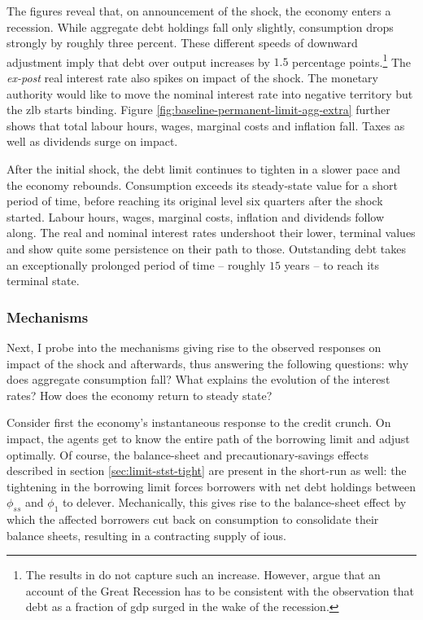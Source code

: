 \documentclass[a4paper,12pt]{article} %
\numberwithin{equation}{section} %
\numberwithin{figure}{section}
\numberwithin{table}{section}
\begin{document}
The figures reveal that, on announcement of the shock, the economy enters a recession. While aggregate debt holdings fall only slightly, consumption drops strongly by roughly three percent. These different speeds of downward adjustment imply that debt over output increases by $1.5$ percentage points.\footnote{The results in \textcite{gl2017} do not capture such an increase. However, \textcite{justiniano2015} argue that an account of the Great Recession has to be consistent with the observation that debt as a fraction of \Gls{gdp} surged in the wake of the recession.} The \textit{ex-post} real interest rate also spikes on impact of the shock. The monetary authority would like to move the nominal interest rate into negative territory but the \Gls{zlb} starts binding. Figure \ref{fig:baseline-permanent-limit-agg-extra} further shows that total labour hours, wages, marginal costs and inflation fall. Taxes as well as dividends surge on impact.

After the initial shock, the debt limit continues to tighten in a slower pace and the economy rebounds. Consumption exceeds its steady-state value for a short period of time, before reaching its original level six quarters after the shock started. Labour hours, wages, marginal costs, inflation and dividends follow along. The real and nominal interest rates undershoot their lower, terminal values and show quite some persistence on their path to those. Outstanding debt takes an exceptionally prolonged period of time -- roughly $15$ years -- to reach its terminal state. 

\subsubsection{Mechanisms}
\label{sec:limit-transition-mechanisms}

Next, I probe into the mechanisms giving rise to the observed responses on impact of the shock and afterwards, thus answering the following questions: why does aggregate consumption fall? What explains the evolution of the interest rates? How does the economy return to steady state?

Consider first the economy's instantaneous response to the credit crunch. On impact, the agents get to know the entire path of the borrowing limit and adjust optimally. Of course, the balance-sheet and precautionary-savings effects described in section \ref{sec:limit-stst-tight} are present in the short-run as well: the tightening in the borrowing limit forces borrowers with net debt holdings between $\phi_{ss}$ and $\phi_1$ to delever. Mechanically, this gives rise to the balance-sheet effect by which the affected borrowers cut back on consumption to consolidate their balance sheets, resulting in a contracting supply of \Gls{iou}s. 
\end{document}
